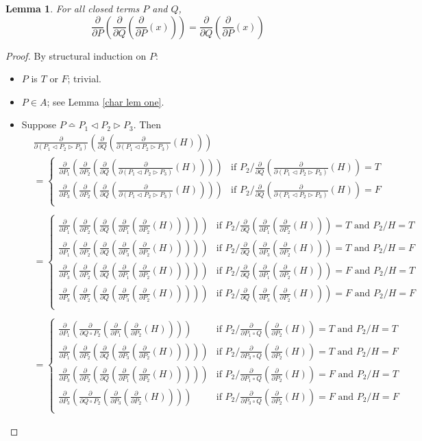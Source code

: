 \documentclass[a4paper,twoside,openright]{report}
\newcommand{\dd}[1]{\frac{\partial}{\partial #1}}
\newcommand{\syn}{\bumpeq}
\newcommand{\lef}{\ensuremath{\triangleleft}}
\newcommand{\rig}{\ensuremath{\triangleright}}
\newtheorem{lem}[theorem]{Lemma}
\begin{document}
\begin{lem}\label{char lem three}
For all closed terms $P$ and $Q$,
\[
\dd P(\dd Q(\dd P(x))) = \dd Q(\dd P(x))
\]
\end{lem}
\begin{proof}
By structural induction on $P$:
\begin{itemize}
\item $P$ is $T$ or $F$; trivial.
\item $P\in A$; see Lemma \ref{char lem one}.
\item Suppose $P\syn P_1\lef P_2\rig P_3$. Then
\begin{align*}
&\dd{(P_1\lef P_2\rig P_3)}(\dd Q(\dd{(P_1\lef P_2\rig P_3)}(H)))\\
&=\begin{cases}
\dd{P_1}(\dd{P_2}(\dd Q(\dd{(P_1\lef P_2\rig P_3)}(H)))) & \text{if $P_2/\dd Q(\dd{(P_1\lef P_2\rig P_3)}(H))=T$}\\
\dd{P_3}(\dd{P_2}(\dd Q(\dd{(P_1\lef P_2\rig P_3)}(H)))) & \text{if $P_2/\dd Q(\dd{(P_1\lef P_2\rig P_3)}(H))=F$}\\
\end{cases}\\\\
&=\begin{cases}
\dd{P_1}(\dd{P_2}(\dd Q(\dd{P_1}(\dd{P_2}(H))))) & \text{if $P_2/\dd Q(\dd{P_1}(\dd{P_2}(H)))=T$ and $P_2/H=T$}\\
\dd{P_1}(\dd{P_2}(\dd Q(\dd{P_3}(\dd{P_2}(H))))) & \text{if $P_2/\dd Q(\dd{P_3}(\dd{P_2}(H)))=T$ and $P_2/H=F$}\\
\dd{P_3}(\dd{P_2}(\dd Q(\dd{P_1}(\dd{P_2}(H))))) & \text{if $P_2/\dd Q(\dd{P_1}(\dd{P_2}(H)))=F$ and $P_2/H=T$}\\
\dd{P_3}(\dd{P_2}(\dd Q(\dd{P_3}(\dd{P_2}(H))))) & \text{if $P_2/\dd Q(\dd{P_3}(\dd{P_2}(H)))=F$ and $P_2/H=F$}\\
\end{cases}\\\\
&=\begin{cases}
\dd{P_1}(\dd{Q\circ P_2}(\dd{P_1}(\dd{P_2}(H)))) & \text{if $P_2/\dd{P_1\circ Q}(\dd{P_2}(H))=T$ and $P_2/H=T$}\\
\dd{P_1}(\dd{P_2}(\dd Q(\dd{P_3}(\dd{P_2}(H))))) & \text{if $P_2/\dd{P_3\circ Q}(\dd{P_2}(H))=T$ and $P_2/H=F$}\\
\dd{P_3}(\dd{P_2}(\dd Q(\dd{P_1}(\dd{P_2}(H))))) & \text{if $P_2/\dd{P_1\circ Q}(\dd{P_2}(H))=F$ and $P_2/H=T$}\\
\dd{P_3}(\dd{Q\circ P_2}(\dd{P_3}(\dd{P_2}(H)))) & \text{if $P_2/\dd{P_3\circ Q}(\dd{P_2}(H))=F$ and $P_2/H=F$}\\

\end{cases}
\end{align*}
\end{itemize}
\end{proof}
\end{document}
